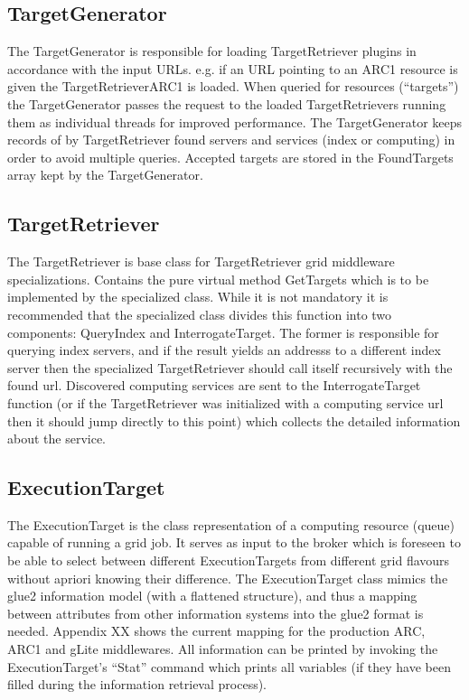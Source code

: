 \documentclass{book}
\begin{document}
\subsection{TargetGenerator} The TargetGenerator is responsible for loading TargetRetriever plugins in accordance with the 
input URLs. e.g. if an URL pointing to an ARC1 resource is given the TargetRetrieverARC1 is loaded. When queried for resources 
(``targets'') the TargetGenerator passes the request to the loaded TargetRetrievers running them as individual threads 
for improved performance. The TargetGenerator keeps records of by TargetRetriever found servers and services 
(index or computing) in order to avoid multiple queries. Accepted targets are stored in the FoundTargets array kept by 
the TargetGenerator.

\subsection{TargetRetriever} The TargetRetriever is base class for TargetRetriever grid middleware specializations. Contains the pure 
virtual method GetTargets which is to be implemented by the specialized class. While it is not mandatory it is recommended 
that the specialized class divides this function into two components: QueryIndex and InterrogateTarget. The former is 
responsible for querying index servers, and if the result yields an addresss to a different index server then the 
specialized TargetRetriever should call itself recursively with the found url. Discovered computing services are sent 
to the InterrogateTarget function (or if the TargetRetriever was initialized with a computing service url then it should 
jump directly to this point) which collects the detailed information about the service.

\subsection{ExecutionTarget} The ExecutionTarget is the class representation of a computing resource (queue) capable of running a grid job. It
serves as input to the broker which is foreseen to be able to select between different ExecutionTargets from different 
grid flavours without apriori knowing their difference. The ExecutionTarget class mimics the glue2 information model (with 
a flattened structure), and thus a mapping between attributes from other information systems into the glue2 format is needed. 
Appendix XX shows the current mapping for the production ARC, ARC1 and gLite middlewares. All information can be printed by 
invoking the ExecutionTarget's ``Stat'' command which prints all variables (if they have been filled during the information 
retrieval process).
\end{document}
